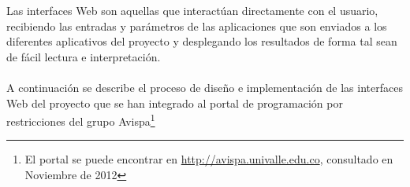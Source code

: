 
Las interfaces Web son aquellas que interactúan directamente con el usuario, recibiendo las entradas y parámetros de las aplicaciones que son enviados a los diferentes aplicativos del proyecto y desplegando los resultados de forma tal sean de fácil lectura e interpretación.
\\\\
A continuación se describe el proceso de diseño e implementación de las interfaces Web del proyecto que se han integrado al portal de programación por restricciones del grupo Avispa\footnote{El portal se puede encontrar en \url{http://avispa.univalle.edu.co}, consultado en Noviembre de 2012}

